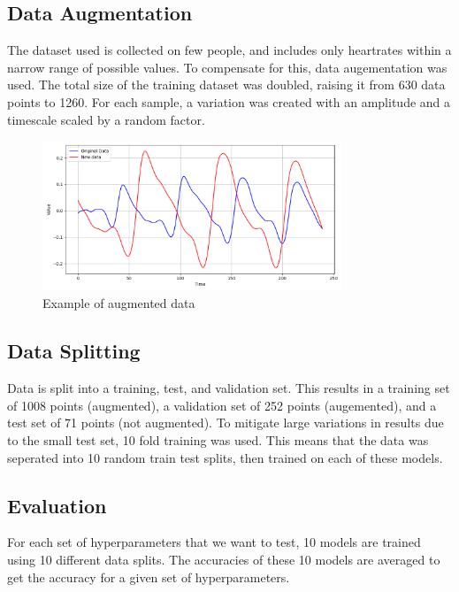 \documentclass{article}
\begin{document}
\subsection{Data Augmentation}

The dataset used is collected on few people, and includes only heartrates within a narrow range of possible values. To compensate for this, data augementation was used. The total size of the training dataset was doubled, raising it from 630 data points to 1260. For each sample, a variation was created with an amplitude and a timescale scaled by a random factor.

\begin{figure}[H]
    \centering
    \includegraphics[width=0.8\textwidth]{../media/aug.png}
    \caption{Example of augmented data}
    \label{fig:augmentation}
\end{figure}


\subsection{Data Splitting}

Data is split into a training, test, and validation set. This results in a training set of 1008 points (augmented), a validation set of 252 points (augemented), and a test set of 71 points (not augmented). To mitigate large variations in results due to the small test set, 10 fold training was used. This means that the data was seperated into 10 random train test splits, then trained on each of these models. 

\subsection{Evaluation}

For each set of hyperparameters that we want to test, 10 models are trained using 10 different data splits. The accuracies of these 10 models are averaged to get the accuracy for a given set of hyperparameters.
\end{document}
